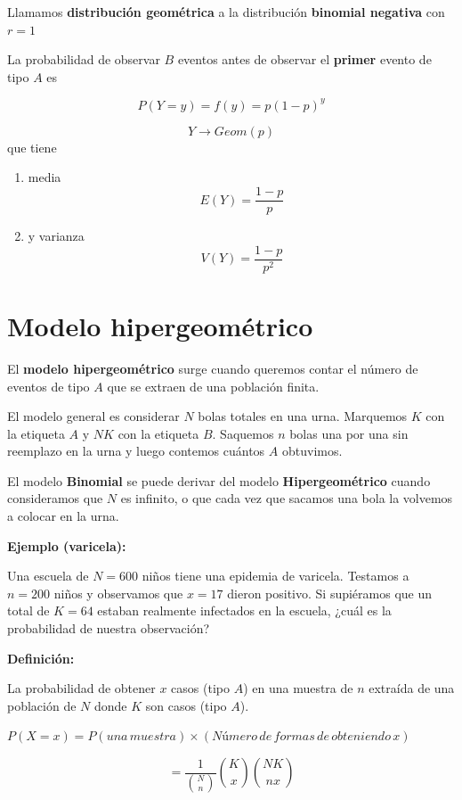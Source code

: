 \documentclass[
]{book}
\begin{document}
Llamamos \textbf{distribución geométrica} a la distribución \textbf{binomial negativa} con \(r=1\)

La probabilidad de observar \(B\) eventos antes de observar el \textbf{primer} evento de tipo \(A\) es

\[P(Y=y)=f(y)= p(1-p)^y\]

\[Y\rightarrow Geom(p)\]
que tiene

\begin{enumerate}
\def\labelenumi{\arabic{enumi})}
\item
  media \[E(Y)= \frac{1-p}{p}\]
\item
  y varianza \[V(Y)= \frac{1-p}{p^2}\]
\end{enumerate}

\hypertarget{modelo-hipergeomuxe9trico}{%
\section{Modelo hipergeométrico}\label{modelo-hipergeomuxe9trico}}

El \textbf{modelo hipergeométrico} surge cuando queremos contar el número de eventos de tipo \(A\) que se extraen de una población finita.

El modelo general es considerar \(N\) bolas totales en una urna. Marquemos \(K\) con la etiqueta \(A\) y \(NK\) con la etiqueta \(B\). Saquemos \(n\) bolas una por una sin reemplazo en la urna y luego contemos cuántos \(A\) obtuvimos.

El modelo \textbf{Binomial} se puede derivar del modelo \textbf{Hipergeométrico} cuando consideramos que \(N\) es infinito, o que cada vez que sacamos una bola la volvemos a colocar en la urna.

\textbf{Ejemplo (varicela):}

Una escuela de \(N=600\) niños tiene una epidemia de varicela. Testamos a \(n=200\) niños y observamos que \(x=17\) dieron positivo. Si supiéramos que un total de \(K=64\) estaban realmente infectados en la escuela, ¿cuál es la probabilidad de nuestra observación?

\textbf{Definición:}

La probabilidad de obtener \(x\) casos (tipo \(A\)) en una muestra de \(n\) extraída de una población de \(N\) donde \(K\) son casos (tipo \(A\)).

\(P(X=x)=P(una\,muestra) \times (Número\, de\, formas\, de\, obteniendo\, x)\)

\[=\frac{1}{\binom N n}\binom K x \binom {NK} {nx}\]
\end{document}
